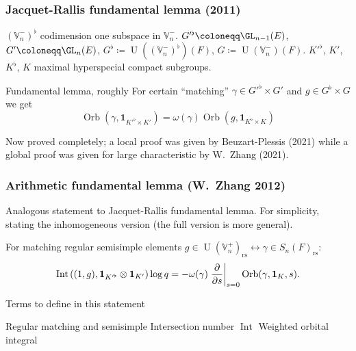 \documentclass[11pt]{beamer}
\DeclareMathOperator{\Int}{Int}
\DeclareMathOperator{\Orb}{Orb}
\DeclareMathOperator{\U}{U}
\newcommand{\VV}{\mathbb{V}}
\newcommand{\rs}{_{\text{rs}}}
\begin{document}
\begin{frame}
  \frametitle{Jacquet-Rallis fundamental lemma (2011)}
  \begin{itemize}
  \ii $(\VV_n^-)^\flat$ codimension one subspace in $\VV_n^-$.
  \ii $G'^\flat \coloneqq \GL_{n-1}(E)$, $G' \coloneqq \GL_n(E)$,
    $G^\flat \coloneqq \U((\VV_n^-)^\flat)(F)$, $G \coloneqq \U(\VV_n^-)(F)$.
  \ii $K'^\flat$, $K'$, $K^\flat$, $K$ maximal hyperspecial compact subgroups.
  \end{itemize}
  \begin{block}{Fundamental lemma, roughly}
    For certain ``matching''
    $\gamma \in G'^\flat \times G'$ and $g \in G^\flat \times G$
    we get
   \[ \Orb(\gamma, \mathbf{1}_{K'^\flat \times K'}) = \omega(\gamma) \Orb(g, \mathbf{1}_{K^\flat \times K}) \]
  \end{block}
  Now proved completely; a local proof was given by Beuzart-Plessis (2021)
  while a global proof was given for large characteristic by W.\ Zhang (2021).
\end{frame}
\begin{frame}
  \frametitle{Arithmetic fundamental lemma (W.\ Zhang 2012)}
  Analogous statement to Jacquet-Rallis fundamental lemma.
  For simplicity, stating the inhomogeneous version (the full version is more general).
  \begin{theorem}
  For matching regular semisimple elements
  $g \in \U(\VV_n^+)\rs \longleftrightarrow \gamma \in S_n(F)\rs$:
  \[
    \Int\left( (1,g), \mathbf{1}_{K'^\flat} \otimes \mathbf{1}_{K'} \right) \log q
    = -\omega(\gamma) \left. \pdv{}{s} \right\rvert_{s=0} \Orb(\gamma, \mathbf{1}_K, s).
  \]
  \end{theorem}
  \begin{exampleblock}{Terms to define in this statement}
  \begin{itemize}
    \ii Regular matching and semisimple
    \ii Intersection number $\Int$
    \ii Weighted orbital integral
  \end{itemize}
  \end{exampleblock}
\end{frame}
\end{document}
